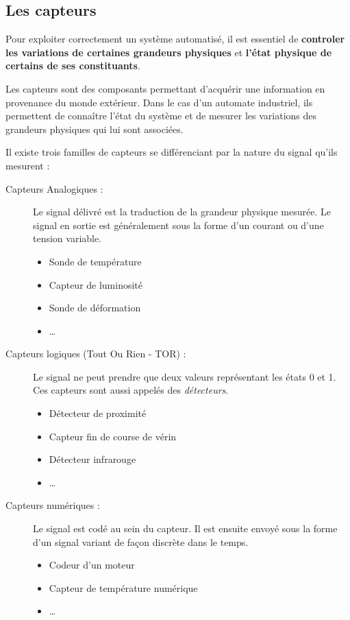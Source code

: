 \subsection{Les capteurs}
Pour exploiter correctement un système automatisé, il est essentiel de \textbf{controler les variations de certaines grandeurs physiques} et \textbf{l'état physique de certains de ses constituants}.

Les capteurs sont des composants permettant d'acquérir une information en provenance du monde extérieur. Dans le cas d'un automate industriel, ils permettent de connaître l'état du système et de mesurer les variations des grandeurs physiques qui lui sont associées.



Il existe trois familles de capteurs se différenciant par la nature du signal qu'ils mesurent :

\begin{description}
	\item [Capteurs Analogiques : ] Le signal délivré est la traduction de la grandeur physique mesurée. Le signal en sortie est généralement sous la forme d'un courant ou d'une tension variable.

	\begin{itemize}
		\item Sonde de température
		\item Capteur de luminosité
		\item Sonde de déformation
		\item \dots
	\end{itemize}

	\item [Capteurs logiques (Tout Ou Rien - TOR) : ] Le signal ne peut prendre que deux valeurs représentant les états 0 et 1. Ces capteurs sont aussi appelés des \textit{détecteurs}.
		\begin{itemize}
			\item Détecteur de proximité
			\item Capteur fin de course de vérin
			\item Détecteur infrarouge
			\item \dots
		\end{itemize}

			\item[Capteurs numériques :] Le signal est codé au sein du capteur. Il est ensuite envoyé sous la forme d'un signal variant de façon discrète dans le temps.
			\begin{itemize}
				\item Codeur d'un moteur
				\item Capteur de température numérique
				\item \dots
			\end{itemize}
\end{description}

